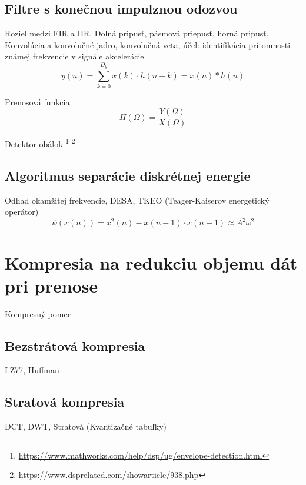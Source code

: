 \subsection{Filtre s konečnou impulznou odozvou}
Roziel medzi FIR a IIR, Dolná pripusť, pásmová priepusť, horná pripusť,
 Konvolúcia a konvolučné jadro, konvolučná veta, účel: identifikácia prítomnosti známej frekvencie v signále akcelerácie
\begin{equation}
y(n) = \sum_{k=0}^{D_y}{x(k) \cdot h(n-k)} = x(n) * h(n)
\end{equation}

Prenosová funkcia
\begin{equation}
H(\Omega) = \frac{Y(\Omega)}{X(\Omega)}
\end{equation}	

Detektor obálok	\footnote{\url{https://www.mathworks.com/help/dsp/ug/envelope-detection.html}} \footnote{\url{https://www.dsprelated.com/showarticle/938.php}}

\subsection{Algoritmus separácie diskrétnej energie}
Odhad okamžitej frekvencie, DESA, TKEO (Teager-Kaiserov energetický operátor) \cite{eeg-spanok} 
\begin{equation}
\psi(x(n)) = x^2(n) - x(n-1) \cdot x(n+1) \approx A^2\omega^2
\end{equation}
	
\section{Kompresia na redukciu objemu dát pri prenose}
Kompresný pomer
\subsection{Bezstrátová kompresia}
LZ77, Huffman 
\subsection{Stratová kompresia}
DCT, DWT, Stratová (Kvantizačné tabuľky)
	
\emptypage 
